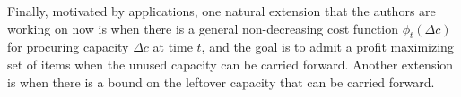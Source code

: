\documentclass[11pt]{article}
\begin{document}
Finally, motivated by applications, one natural extension that the authors are working on now is when there is a general non-decreasing cost function $\phi_t(\Delta c)$ for procuring capacity $\Delta c$ at time $t$, and the goal is to admit a profit maximizing set of items when the unused capacity can be carried forward. Another extension is when there is a bound on the leftover capacity that can be carried forward.
	
 
	
	
	{\small
		\begin{spacing}{1.2}
			
			
		\end{spacing}
	}
	
	
	\begin{appendix}
		 
		
	\end{appendix}
	
	
	
	
	
	
	
\end{document}
